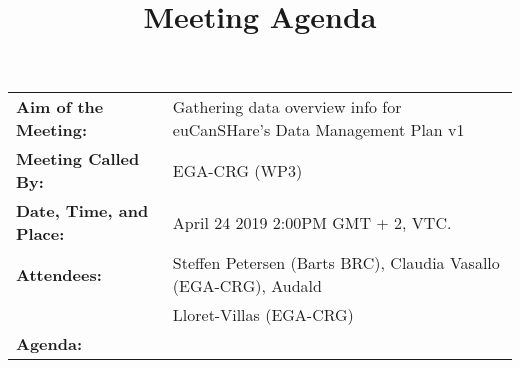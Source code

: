 \documentclass{article}
\begin{document}




\title{Meeting Agenda}
\date{}

%
%


\begin{table}[h]
  \begin{tabular}{ll}
\textbf{Aim of the Meeting:} & Gathering data overview info for euCanSHare's Data Management Plan v1 \\  [5pt]  
\textbf{Meeting Called By:}  &EGA-CRG (WP3)\\[ 5pt]
  \textbf{Date, Time, and Place:}  & April  24 2019 2:00PM GMT + 2, VTC. \\ [5pt]
  \textbf{Attendees:}  & Steffen Petersen (Barts BRC), Claudia Vasallo (EGA-CRG), Audald \\
 &  Lloret-Villas (EGA-CRG) \\ [50pt]    
\textbf{Agenda:}  &   \\ 
\end{tabular}
\end{table}
%
%

%
%
 
\end{document}
